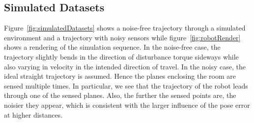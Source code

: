 \documentclass[5p]{elsarticle}
\begin{document}
\subsection{Simulated Datasets}

Figure~\ref{fig:simulatedDatasets} shows a noise-free trajectory through a simulated environment and a trajectory with noisy sensors while figure~\ref{fig:robotRender} shows a rendering of the simulation sequence.
In the noise-free case, the trajectory slightly bends in the direction of disturbance torque sideways while also varying in velocity in the intended direction of travel.
In the noisy case, the ideal straight trajectory is assumed.
Hence the planes enclosing the room are sensed multiple times. 
In particular, we see that the trajectory of the robot leads through one of the sensed planes. 
Also, the further the sensed points are, the noisier they appear, which is consistent with the larger influence of the pose error at higher distances.  
\end{document}
